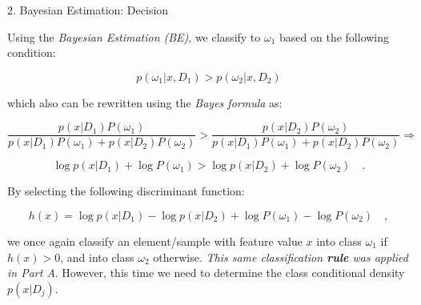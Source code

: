 \documentclass[aspectratio=169,xcolor=dvipsnames]{beamer}
\begin{document}

\begin{frame}{2. Bayesian Estimation: Decision}

    Using the \textit{Bayesian Estimation (BE)}, we classify to $\omega_1$ based on the following condition:

    \vspace{-5pt}

    $$ p(\omega_1 | x, D_1) > p(\omega_2 | x, D_2) $$
    
    which also can be rewritten using the \textit{Bayes formula} as:
    
    $$ 
    \frac{p(x | D_1) P(\omega_1)}{p(x | D_1) P(\omega_1) + p(x | D_2) P(\omega_2)} > 
    \frac{p(x | D_2) P(\omega_2)}{p(x | D_1) P(\omega_1) + p(x | D_2) P(\omega_2)} \Rightarrow
    $$
    
    $$ \log p(x | D_1) + \log P(\omega_1) > \log p(x | D_2) + \log P(\omega_2) \quad. $$

    \vspace{5pt}
    
    By selecting the following discriminant function:

    \vspace{-10pt}
    
    $$ h(x) = \log p(x | D_1) - \log p(x | D_2) + \log P(\omega_1) - \log P(\omega_2) \quad, $$
    
    we once again classify an element/sample with feature value $x$ into class $\omega_1$ if $h(x) > 0$, and into class $\omega_2$ otherwise. \textit{This same classification \textbf{rule} was applied in Part A}. However, this time we need to determine the \alert{class conditional density $p(x | D_j)$}.


\end{frame}

\end{document}
